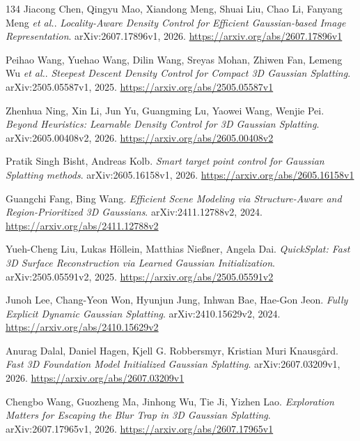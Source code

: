 \documentclass[11pt,a4paper]{article}
\begin{document}
\begin{thebibliography}{134}
Jiacong Chen, Qingyu Mao, Xiandong Meng, Shuai Liu, Chao Li, Fanyang Meng \emph{et al.}.
\newblock \emph{Locality-Aware Density Control for Efficient Gaussian-based Image Representation}.
\newblock arXiv:2607.17896v1, 2026.
\newblock \url{https://arxiv.org/abs/2607.17896v1}

Peihao Wang, Yuehao Wang, Dilin Wang, Sreyas Mohan, Zhiwen Fan, Lemeng Wu \emph{et al.}.
\newblock \emph{Steepest Descent Density Control for Compact 3D Gaussian Splatting}.
\newblock arXiv:2505.05587v1, 2025.
\newblock \url{https://arxiv.org/abs/2505.05587v1}

Zhenhua Ning, Xin Li, Jun Yu, Guangming Lu, Yaowei Wang, Wenjie Pei.
\newblock \emph{Beyond Heuristics: Learnable Density Control for 3D Gaussian Splatting}.
\newblock arXiv:2605.00408v2, 2026.
\newblock \url{https://arxiv.org/abs/2605.00408v2}

Pratik Singh Bisht, Andreas Kolb.
\newblock \emph{Smart target point control for Gaussian Splatting methods}.
\newblock arXiv:2605.16158v1, 2026.
\newblock \url{https://arxiv.org/abs/2605.16158v1}

Guangchi Fang, Bing Wang.
\newblock \emph{Efficient Scene Modeling via Structure-Aware and Region-Prioritized 3D Gaussians}.
\newblock arXiv:2411.12788v2, 2024.
\newblock \url{https://arxiv.org/abs/2411.12788v2}

Yueh-Cheng Liu, Lukas H\"{o}llein, Matthias Nie\ss{}ner, Angela Dai.
\newblock \emph{QuickSplat: Fast 3D Surface Reconstruction via Learned Gaussian Initialization}.
\newblock arXiv:2505.05591v2, 2025.
\newblock \url{https://arxiv.org/abs/2505.05591v2}

Junoh Lee, Chang-Yeon Won, Hyunjun Jung, Inhwan Bae, Hae-Gon Jeon.
\newblock \emph{Fully Explicit Dynamic Gaussian Splatting}.
\newblock arXiv:2410.15629v2, 2024.
\newblock \url{https://arxiv.org/abs/2410.15629v2}

Anurag Dalal, Daniel Hagen, Kjell G. Robbersmyr, Kristian Muri Knausg\r{a}rd.
\newblock \emph{Fast 3D Foundation Model Initialized Gaussian Splatting}.
\newblock arXiv:2607.03209v1, 2026.
\newblock \url{https://arxiv.org/abs/2607.03209v1}

Chengbo Wang, Guozheng Ma, Jinhong Wu, Tie Ji, Yizhen Lao.
\newblock \emph{Exploration Matters for Escaping the Blur Trap in 3D Gaussian Splatting}.
\newblock arXiv:2607.17965v1, 2026.
\newblock \url{https://arxiv.org/abs/2607.17965v1}


\end{thebibliography}
\end{document}
